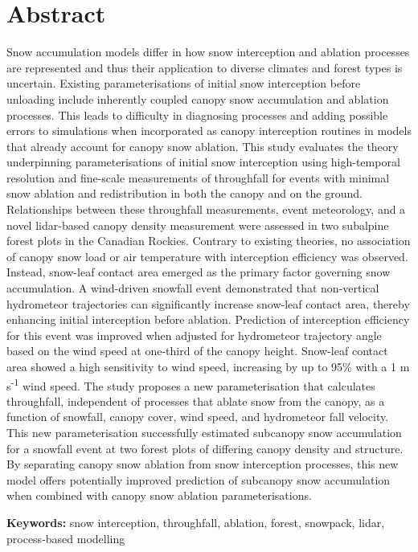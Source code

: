 \documentclass[
  letterpaper,
]{tex/uofsthesis-cs}
\begin{document}
\section{Abstract}\label{abstract-1}

Snow accumulation models differ in how snow interception and ablation
processes are represented and thus their application to diverse climates
and forest types is uncertain. Existing parameterisations of initial
snow interception before unloading include inherently coupled canopy
snow accumulation and ablation processes. This leads to difficulty in
diagnosing processes and adding possible errors to simulations when
incorporated as canopy interception routines in models that already
account for canopy snow ablation. This study evaluates the theory
underpinning parameterisations of initial snow interception using
high-temporal resolution and fine-scale measurements of throughfall for
events with minimal snow ablation and redistribution in both the canopy
and on the ground. Relationships between these throughfall measurements,
event meteorology, and a novel lidar-based canopy density measurement
were assessed in two subalpine forest plots in the Canadian Rockies.
Contrary to existing theories, no association of canopy snow load or air
temperature with interception efficiency was observed. Instead,
snow-leaf contact area emerged as the primary factor governing snow
accumulation. A wind-driven snowfall event demonstrated that
non-vertical hydrometeor trajectories can significantly increase
snow-leaf contact area, thereby enhancing initial interception before
ablation. Prediction of interception efficiency for this event was
improved when adjusted for hydrometeor trajectory angle based on the
wind speed at one-third of the canopy height. Snow-leaf contact area
showed a high sensitivity to wind speed, increasing by up to 95\% with a
1 m s\textsuperscript{-1} wind speed. The study proposes a new
parameterisation that calculates throughfall, independent of processes
that ablate snow from the canopy, as a function of snowfall, canopy
cover, wind speed, and hydrometeor fall velocity. This new
parameterisation successfully estimated subcanopy snow accumulation for
a snowfall event at two forest plots of differing canopy density and
structure. By separating canopy snow ablation from snow interception
processes, this new model offers potentially improved prediction of
subcanopy snow accumulation when combined with canopy snow ablation
parameterisations.

\textbf{Keywords:} snow interception, throughfall, ablation, forest,
snowpack, lidar, process-based modelling
\end{document}
